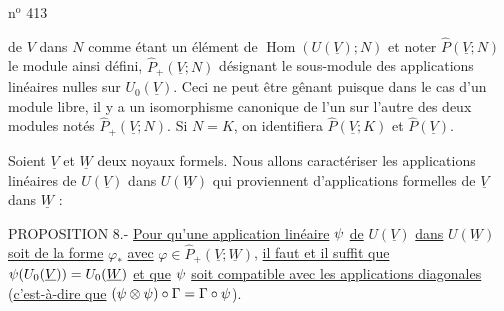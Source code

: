 
\hfill n$^{\mathrm o}$ 413

de $V$ dans $N$ comme étant un élément de $\operatorname{Hom}(U(\underline V);N)$ et noter $\widehat P(\underline V;N)$ le module ainsi défini, $\widehat P_+(\underline V;N)$ désignant le sous-module des applications linéaires nulles sur $U_0(\underline V)$. Ceci ne peut être gênant puisque dans le cas d'un module libre, il y a un isomorphisme canonique de l'un sur l'autre des deux modules notés $\widehat P_+(\underline V;N)$. Si $N=K$, on identifiera $\widehat P(\underline V;K)$ et $\widehat P(\underline V)$.

Soient $\underline V$ et $\underline W$ deux noyaux formels. Nous allons caractériser les applications linéaires de $U(\underline V)$ dans $U(\underline W)$ qui proviennent d'applications formelles de $\underline V$ dans $\underline W$ :

PROPOSITION 8.- \uline{Pour qu'une application linéaire} $\psi$ \uline{de} $U(\underline V)$ \uline{dans} $U(\underline W)$ \uline{soit de la forme} $\varphi_*$ \uline{avec} $\varphi\in\widehat P_+(\underline V;\underline W)$, \uline{il faut et il suffit que} $\psi(U_0(\underline V))=U_0(\underline W)$ \uline{et que} $\psi$ \uline{soit compatible avec les applications diagonales} (\uline{c'est-à-dire que} $(\psi\otimes\psi)\circ\Gamma=\Gamma\circ\psi$).

